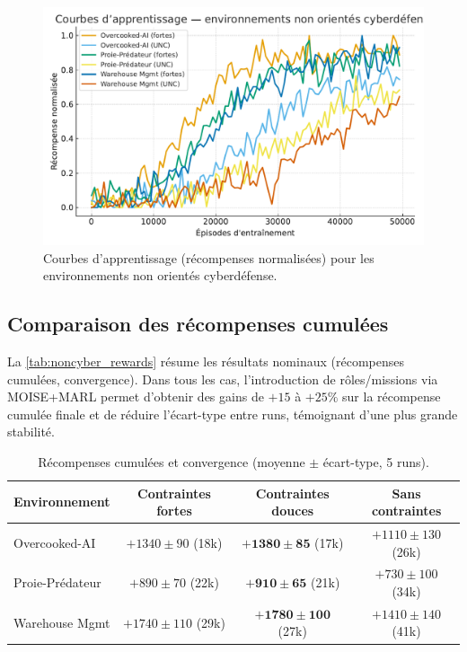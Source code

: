 \begin{figure}[h!]
    \centering
    \includegraphics[width=0.75\linewidth]{figures/results_noncyber_learning.pdf}
    \caption{Courbes d’apprentissage (récompenses normalisées) pour les environnements non orientés cyberdéfense.}
    \label{fig:noncyber_learning_curves}
\end{figure}

\subsection*{Comparaison des récompenses cumulées}

La \autoref{tab:noncyber_rewards} résume les résultats nominaux (récompenses cumulées, convergence).
Dans tous les cas, l’introduction de rôles/missions via MOISE+MARL permet d’obtenir des gains de $+15$ à $+25\%$ sur la récompense cumulée finale et de réduire l’écart-type entre runs, témoignant d’une plus grande stabilité.

\begin{table}[h!]
    \centering
    \caption{Récompenses cumulées et convergence (moyenne $\pm$ écart-type, 5 runs).}
    \label{tab:noncyber_rewards}
    \renewcommand{\arraystretch}{1.2}
    \small
    \begin{tabular}{lccc}
        \hline
        \textbf{Environnement} & \textbf{Contraintes fortes} & \textbf{Contraintes douces}    & \textbf{Sans contraintes} \\
        \hline
        Overcooked-AI          & $+1340 \pm 90$ (18k)        & $\mathbf{+1380 \pm 85}$ (17k)  & $+1110 \pm 130$ (26k)     \\
        Proie-Prédateur        & $+890 \pm 70$ (22k)         & $\mathbf{+910 \pm 65}$ (21k)   & $+730 \pm 100$ (34k)      \\
        Warehouse Mgmt         & $+1740 \pm 110$ (29k)       & $\mathbf{+1780 \pm 100}$ (27k) & $+1410 \pm 140$ (41k)     \\
        \hline
    \end{tabular}
\end{table}

